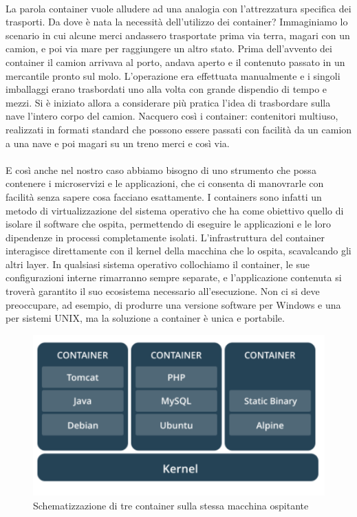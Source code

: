 \paragraph{}
La parola container vuole alludere ad una analogia con l'attrezzatura specifica dei trasporti. Da dove è nata la necessità dell'utilizzo dei container? Immaginiamo lo scenario in cui alcune merci andassero trasportate prima via terra, magari con un camion, e poi via mare per raggiungere un altro stato. Prima dell'avvento dei container il camion arrivava al porto, andava aperto e il contenuto passato in un mercantile pronto sul molo. L'operazione era effettuata manualmente e i singoli imballaggi erano trasbordati uno alla volta con grande dispendio di tempo e mezzi. Si è iniziato allora a considerare più pratica l'idea di trasbordare sulla nave l'intero corpo del camion. Nacquero così i container: contenitori multiuso, realizzati in formati standard che possono essere passati con facilità da un camion a una nave e poi magari su un treno merci e così via.

\paragraph{}
E così anche nel nostro caso abbiamo bisogno di uno strumento che possa contenere i microservizi e le applicazioni, che ci consenta di manovrarle con facilità senza sapere cosa facciano esattamente.
I containers sono infatti un metodo di virtualizzazione del sistema operativo che ha come obiettivo quello di isolare il software che ospita, permettendo di eseguire le applicazioni e le loro dipendenze in processi completamente isolati. L'infrastruttura del container interagisce direttamente con il kernel della macchina che lo ospita, scavalcando gli altri layer. In qualsiasi sistema operativo collochiamo il container, le sue configurazioni interne rimarranno sempre separate, e l'applicazione contenuta si troverà garantito il suo ecosistema necessario all'esecuzione. Non ci si deve preoccupare, ad esempio, di produrre una versione software per Windows e una per sistemi UNIX, ma la soluzione a container è unica e portabile. 

\begin{figure}[h!]
	\centering
	\includegraphics[width=\textwidth,keepaspectratio=true]{capitoli/imgs/container.PNG}
	\caption{Schematizzazione di tre container sulla stessa macchina ospitante}
\end{figure}

